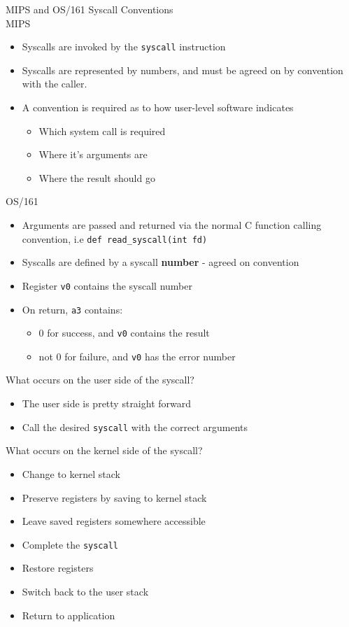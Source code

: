 \documentclass[journal, letterpaper]{IEEEtran}
\begin{document}
\begin{theory}{MIPS and OS/161 Syscall Conventions} \\
    MIPS
    \begin{itemize}
        \item Syscalls are invoked by the \verb|syscall| instruction
        \item Syscalls are represented by numbers, and must be agreed on by convention with the caller.
        \item A convention is required as to how user-level software indicates
        \begin{itemize}
            \item Which system call is required
            \item Where it's arguments are
            \item Where the result should go
        \end{itemize}
    \end{itemize}
    OS/161
    \begin{itemize}
        \item Arguments are passed and returned via the normal C function calling convention, i.e \verb|def read_syscall(int fd)|
        \item Syscalls are defined by a syscall \textbf{number} - agreed on convention
        \item Register \verb|v0| contains the syscall number
        \item On return, \verb|a3| contains:
        \begin{itemize}
            \item 0 for success, and \verb|v0| contains the result
            \item not 0 for failure, and \verb|v0| has the error number
        \end{itemize}
    \end{itemize}
\end{theory}
\begin{aside}{What occurs on the user side of the syscall?}
    \begin{itemize}
        \item The user side is pretty straight forward
        \item Call the desired \verb|syscall| with the correct arguments
    \end{itemize}
\end{aside}
\begin{aside}{What occurs on the kernel side of the syscall?}
    \begin{itemize}
        \item Change to kernel stack
        \item Preserve registers by saving to kernel stack
        \item Leave saved registers somewhere accessible
        \item Complete the \verb|syscall|
        \item Restore registers
        \item Switch back to the user stack
        \item Return to application
    \end{itemize}
\end{aside}
\end{document}
